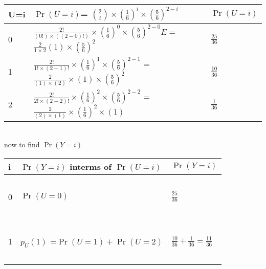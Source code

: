\documentclass[journal,12pt,onecolumn]{IEEEtran}
\providecommand{\pr}[1]{\ensuremath{\Pr\left(#1\right)}}
\providecommand{\brak}[1]{\ensuremath{\left(#1\right)}}
\theoremstyle{remark}
\begin{document}
\begin{enumerate}
\begin{tabular}{|l|l|l|}
\hline
U=i & $\pr{U=i}$= \large${2 \choose i}\times \brak{\frac{1}{6}}^i\times\brak{\frac{5}{6}}^{2-i}$ &  $\pr{U=i}$ \\
\hline
0 & \large $\frac{2!}{(0!)\times((2-0)!)}\times\brak{\frac{1}{6}}^0\times\brak{\frac{5}{6}}^{2-0}E
 = $\large $ \frac{2}{1\times2}(1)\times\brak{\frac{5}{6}}^{2}$ & \Large $\frac{25}{36}$\\
 \hline
1 & \large $\frac{2!}{1!\times(2-1)!}\times\brak{\frac{1}{6}}^{1}\times\brak{\frac{5}{6}}^{2-1}$
= \large $\frac{2}{(1)\times(2)}\times(1)\times\brak{\frac{5}{6}}^{2}$ & \Large$\frac{10}{36}$ \\
\hline
2 & \large $\frac{2!}{2!\times(2-2)!}\times\brak{\frac{1}{6}}^{2}\times\brak{\frac{5}{6}}^{2-2}$ 
= \large $\frac{2}{(2)\times(1)}\times\brak{\frac{1}{6}}^{2}\times(1)$ & \Large $\frac{1}{36}$\\
\hline
\end{tabular}
\vspace{2mm}\\
now to find $\pr{Y=i}$ \\
\begin{tabular}{|l|l|l|}
\hline
\large i & \large $\pr{Y=i}$ \large interms \large of \large $\pr{U=i}$  & \large$\pr{Y=i}$ \\
\hline
\ & \ & \ \\
\large 0 & \large $\pr{U=0}$ & \Large{$\frac{25}{36}$}\\
\ & \ & \ \\ 
\hline
\ & \ & \ \\
\large 1 & \large $p_U(1)$ =$\pr{U=1}+\pr{U=2}$  & \Large $\frac{10}{36}+ \frac{1}{36}=\frac{11}{36} $\\
\ & \ & \ \\
\hline
\end{tabular}

\end{enumerate}
\end{document}

